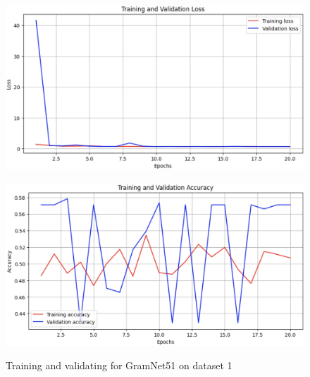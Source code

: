 \documentclass[final]{cvpr}
\begin{document}
\begin{figure}[t]
\centering
\begin{minipage}{0.45\linewidth}
   \includegraphics[width=\linewidth]{images/gramnet51_d1_loss.jpg}
   \label{fig:image1}
\end{minipage}
\hfill
\begin{minipage}{0.45\linewidth}
   \includegraphics[width=\linewidth]{images/gramnet51_d1_acc.jpg}
   \label{fig:image2}
\end{minipage}
\caption{Training and validating for GramNet51 on dataset 1}
\label{fig:gramnet51_d1}
\end{figure}
\end{document}
